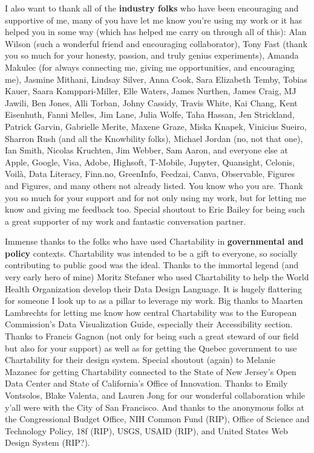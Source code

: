 \documentclass[12pt]{cmuthesis}
\begin{document}
I also want to thank all of the \textbf{industry folks} who have been encouraging and supportive of me, many of you have let me know you're using my work or it has helped you in some way (which has helped me carry on through all of this): Alan Wilson (such a wonderful friend and encouraging collaborator), Tony Fast (thank you so much for your honesty, passion, and truly genius experiments), Amanda Makulec (for always connecting me, giving me opportunities, and encouraging me), Jasmine Mithani, Lindsay Silver, Anna Cook, Sara Elizabeth Temby, Tobias Kauer, Saara Kamppari-Miller, Elle Waters, James Nurthen, James Craig, MJ Jawili, Ben Jones, Alli Torban, Johny Cassidy, Travis White, Kai Chang, Kent Eisenhuth, Fanni Melles, Jim Lane, Julia Wolfe, Taha Hassan, Jen Strickland, Patrick Garvin, Gabrielle Merite, Maxene Graze, Miska Knapek, Vinicius Sueiro, Sharron Rush (and all the Knowbility folks), Michael Jordan (no, not that one), Ian Smith, Nicolas Kruchten, Jim Webber, Sam Aaron, and everyone else at Apple, Google, Visa, Adobe, Highsoft, T-Mobile, Jupyter, Quansight, Celonis, Voilà, Data Literacy, Finn.no, GreenInfo, Feedzai, Canva, Observable, Figures and Figures, and many others not already listed. You know who you are. Thank you so much for your support and for not only using my work, but for letting me know and giving me feedback too. Special shoutout to Eric Bailey for being such a great supporter of my work and fantastic conversation partner.

Immense thanks to the folks who have used Chartability in \textbf{governmental and policy} contexts. Chartability was intended to be a gift to everyone, so socially contributing to public good was the ideal. Thanks to the immortal legend (and very early hero of mine) Moritz Stefaner who used Chartability to help the World Health Organization develop their Data Design Language. It is hugely flattering for someone I look up to as a pillar to leverage my work. Big thanks to Maarten Lambrechts for letting me know how central Chartability was to the European Commission's Data Visualization Guide, especially their Accessibility section. Thanks to Francis Gagnon (not only for being such a great steward of our field but also for your support) as well as for getting the Quebec government to use Chartability for their design system. Special shoutout (again) to Melanie Mazanec for getting Chartability connected to the State of New Jersey's Open Data Center and State of California's Office of Innovation. Thanks to Emily Vontsolos, Blake Valenta, and Lauren Jong for our wonderful collaboration while y'all were with the City of San Francisco. And thanks to the anonymous folks at the Congressional Budget Office, NIH Common Fund (RIP), Office of Science and Technology Policy, 18f (RIP), USGS, USAID (RIP), and United States Web Design System (RIP?).
\end{document}
